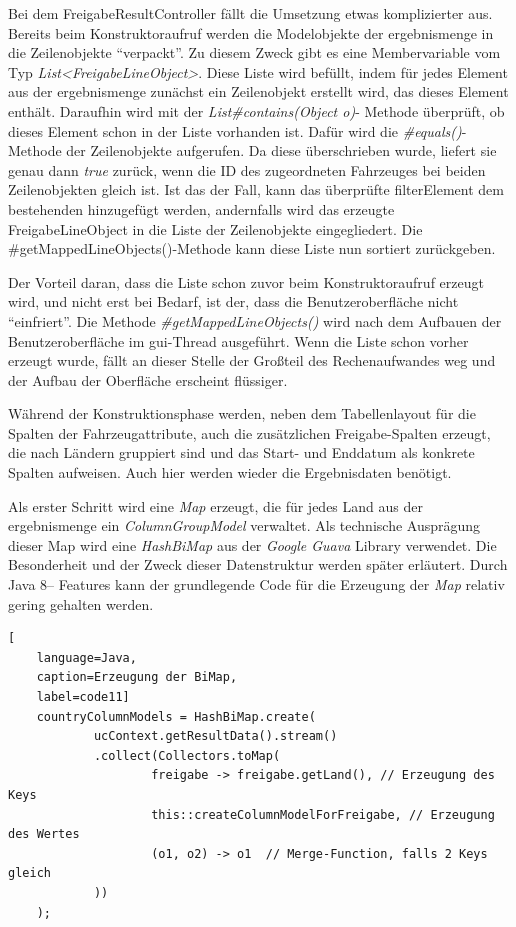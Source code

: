 Bei dem FreigabeResultController fällt die Umsetzung etwas komplizierter aus. Bereits beim Konstruktoraufruf werden die Modelobjekte der \gls{ergebnismenge} in die Zeilenobjekte \enquote{verpackt}. Zu diesem Zweck gibt es eine Membervariable vom Typ \textit{List<Frei\-ga\-be\-Line\-Ob\-ject>}. Diese Liste wird befüllt, indem für jedes Element aus der \gls{ergebnismenge} zunächst ein Zeilenobjekt erstellt wird, das dieses Element enthält. Daraufhin wird mit der \textit{List\#con\-tains(Ob\-ject o)}- Methode überprüft, ob dieses Element schon in der Liste vorhanden ist. Dafür wird die \textit{\#equals()}-Methode der Zeilenobjekte aufgerufen. Da diese überschrieben wurde, liefert sie genau dann \textit{true} zurück, wenn die ID des zugeordneten Fahrzeuges bei beiden Zeilenobjekten gleich ist. Ist das der Fall, kann das überprüfte \gls{filterElement} dem bestehenden hinzugefügt werden, andernfalls wird das erzeugte FreigabeLineObject in die Liste der Zeilenobjekte eingegliedert. Die \#getMappedLineObjects()-Methode kann diese Liste nun sortiert zurückgeben.

Der Vorteil daran, dass die Liste schon zuvor beim Konstruktoraufruf erzeugt wird, und nicht erst bei Bedarf, ist der, dass die Benutzeroberfläche nicht \enquote{einfriert}. Die Methode \textit{\#getMappedLineObjects()} wird nach dem Aufbauen der Benutzeroberfläche im \gls{gui}-Thread ausgeführt. Wenn die Liste schon vorher erzeugt wurde, fällt an dieser Stelle der Großteil des Rechenaufwandes weg und der Aufbau der Oberfläche erscheint flüssiger.

Während der Konstruktionsphase werden, neben dem Tabellenlayout für die Spalten der Fahrzeugattribute, auch die zusätzlichen Freigabe-Spalten erzeugt, die nach Ländern gruppiert sind und das Start- und Enddatum als konkrete Spalten aufweisen. Auch hier werden wieder die Ergebnisdaten benötigt.

Als erster Schritt wird eine \textit{Map} erzeugt, die für jedes Land aus der \gls{ergebnismenge} ein \textit{ColumnGroupModel} verwaltet. Als technische Ausprägung dieser Map wird eine \textit{HashBiMap} aus der \textit{Google Guava} Library verwendet. Die Besonderheit und der Zweck dieser Datenstruktur werden später erläutert. Durch Java 8– Features kann der grundlegende Code für die Erzeugung der \textit{Map} relativ gering gehalten werden.

\begin{lstlisting}[
    language=Java,
    caption=Erzeugung der BiMap,
    label=code11]
	countryColumnModels = HashBiMap.create(
			ucContext.getResultData().stream()
			.collect(Collectors.toMap(
					freigabe -> freigabe.getLand(),	// Erzeugung des Keys
					this::createColumnModelForFreigabe, // Erzeugung des Wertes
					(o1, o2) -> o1	// Merge-Function, falls 2 Keys gleich
	 		))
	);
\end{lstlisting}

